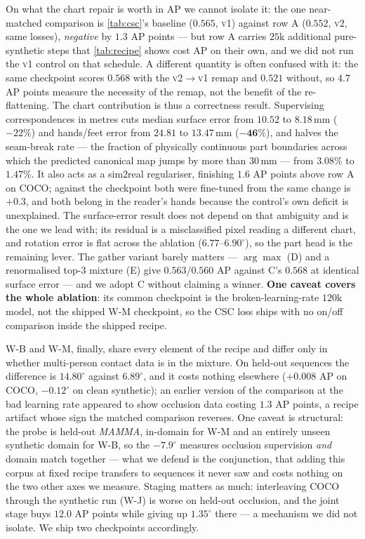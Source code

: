 On what the chart repair is worth in AP we cannot isolate it: the one near-matched comparison is
\cref{tab:csc}'s baseline ($0.565$, \textsc{v1}) against row A ($0.552$, \textsc{v2}, same losses),
\emph{negative} by $1.3$ AP points --- but row A carries $25$k additional pure-synthetic steps that
\cref{tab:recipe} shows cost AP on their own, and we did not run the \textsc{v1} control on that
schedule. A different quantity is often confused with it: the same checkpoint scores $0.568$ with
the \textsc{v2}$\to$\textsc{v1} remap and $0.521$ without, so $4.7$ AP points measure the necessity
of the remap, not the benefit of the re-flattening. The chart contribution is thus a correctness
result. Supervising correspondences in metres cuts median surface error from
$10.52$ to $8.18$\,mm ($-22\%$) and hands/feet error from $24.81$ to $13.47$\,mm
($\mathbf{-46\%}$), and halves the seam-break rate --- the fraction of physically continuous part
boundaries across which the predicted canonical map jumps by more than $30$\,mm --- from $3.08\%$
to $1.47\%$. It also acts as a sim2real regulariser, finishing $1.6$ AP points above row A on COCO;
against the checkpoint both were fine-tuned from the same change is $+0.3$, and both belong in the
reader's hands because the control's own deficit is unexplained. The surface-error result does not
depend on that ambiguity and is the one we lead with; its residual is a misclassified pixel reading
a different chart, and rotation error is flat across the ablation ($6.77$--$6.90^\circ$), so the
part head is the remaining lever. The gather variant barely matters --- $\arg\max$ (D) and a
renormalised top-$3$ mixture (E) give $0.563$/$0.560$ AP against C's $0.568$ at identical surface
error --- and we adopt C without claiming a winner. \textbf{One caveat covers the whole ablation}:
its common checkpoint is the broken-learning-rate $120$k model, not the shipped W-M checkpoint, so
the CSC loss ships with no on/off comparison inside the shipped recipe.

W-B and W-M, finally, share every element of the recipe and differ only in whether multi-person
contact data is in the mixture. On held-out sequences the difference is $14.80^\circ$ against
$6.89^\circ$, and it costs nothing elsewhere ($+0.008$ AP on COCO, $-0.12^\circ$ on clean
synthetic); an earlier version of the comparison at the bad learning rate appeared to show
occlusion data costing $1.3$ AP points, a recipe artifact whose sign the matched comparison
reverses. One caveat is structural: the probe is held-out \emph{MAMMA}, in-domain for W-M and an
entirely unseen synthetic domain for W-B, so the $-7.9^\circ$ measures occlusion supervision
\emph{and} domain match together --- what we defend is the conjunction, that adding this corpus at
fixed recipe transfers to sequences it never saw and costs nothing on the two other axes we
measure. Staging matters as much: interleaving COCO through the synthetic run (W-J) is worse on
held-out occlusion, and the joint stage buys $12.0$ AP points while giving up $1.35^\circ$ there ---
a mechanism we did not isolate. We ship two checkpoints accordingly.
